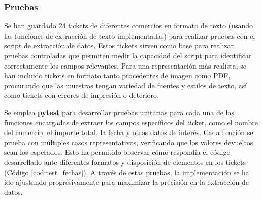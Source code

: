\subsubsection{Pruebas}
Se han guardado 24 tickets de diferentes comercios en formato de texto (usando las funciones de extracción de texto implementadas) para realizar pruebas con el script de extracción de datos. Estos tickets sirven como base para realizar pruebas controladas que permiten medir la capacidad del script para identificar correctamente los campos relevantes. Para una representación más realista, se han incluido tickets en formato tanto procedentes de imagen como PDF, procurando que las muestras tengan variedad de fuentes y estilos de texto, así como tickets con errores de impresión o deterioro.

Se emplea \textbf{pytest} para desarrollar pruebas unitarias para cada una de las funciones encargadas de extraer los campos específicos del ticket, como el nombre del comercio, el importe total, la fecha y otros datos de interés. Cada función se prueba con múltiples casos representativos, verificando que los valores devueltos sean los esperados. Esto ha permitido observar cómo respondía el código desarrollado ante diferentes formatos y disposición de elementos en los tickets (Código \ref{cod:test_fechas}). A través de estas pruebas, la implementación se ha ido ajustando progresivamente para maximizar la precisión en la extracción de datos.

